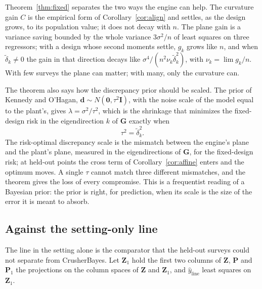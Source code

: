 Theorem~\ref{thm:fixed} separates the two ways the engine can help. The curvature gain $C$ is the empirical form of
Corollary~\ref{cor:align} and settles, as the design grows, to its population value; it does not decay with $n$. The plane
gain is a variance saving bounded by the whole variance $3\sigma^2/n$ of least squares on three regressors; with a design
whose second moments settle, $g_k$ grows like $n$, and when $\tilde\delta_k\ne0$ the gain in that direction decays like
$\sigma^4/(n^2\nu_k\tilde\delta_k^2)$, with $\nu_k=\lim g_k/n$. With few surveys the plane can matter; with many, only the
curvature can.

The theorem also says how the discrepancy prior should be scaled. The prior of Kennedy and O'Hagan, $\mathbf d\sim
N(\mathbf 0,\tau^2\mathbf I)$, with the noise scale of the model equal to the plant's, gives $\lambda=\sigma^2/\tau^2$, which is
the shrinkage that minimizes the fixed-design risk in the eigendirection $k$ of $\mathbf G$ exactly when
\begin{equation}
\tau^2=\tilde\delta_k^2 .
\label{eq:taustar}
\end{equation}
The risk-optimal discrepancy scale is the mismatch between the engine's plane and the plant's plane, measured in the
eigendirections of $\mathbf G$, for the fixed-design risk; at held-out points the cross term of Corollary~\ref{cor:affine}
enters and the optimum moves. A single $\tau$ cannot match three different mismatches, and the theorem gives the
loss of every compromise. This is a frequentist reading of a Bayesian prior: the prior is right, for prediction, when its
scale is the size of the error it is meant to absorb.

\subsection{Against the setting-only line}

The line in the setting alone is the comparator that the held-out surveys could not separate from CrusherBayes. Let
$\mathbf Z_1$ hold the first two columns of $\mathbf Z$, $\mathbf P$ and $\mathbf P_1$ the projections on the column spaces of
$\mathbf Z$ and $\mathbf Z_1$, and $\hat y_{\mathrm{line}}$ least squares on $\mathbf Z_1$.

